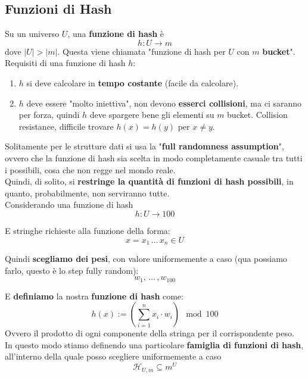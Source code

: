 
\newpage

\subsection{Funzioni di Hash}

Su un universo $U$, una \textbf{funzione di hash} è 
$$ h: U \rightarrow m $$
dove $|U| > |m|$. Questa viene chiamata "funzione di hash per $U$ con $m$ \textbf{bucket}".\\

Requisiti di una funzione di hash $h$: 
\begin{enumerate}
	\item $h$ si deve calcolare in \textbf{tempo costante} (facile da calcolare).\\
	
	\item $h$ deve essere "molto iniettiva", non devono \textbf{esserci collisioni}, ma ci saranno per forza, quindi $h$ deve spargere bene gli elementi su $m$ bucket. Collision resistance, difficile trovare $h(x) = h(y)$ per $x \neq y$.\\
\end{enumerate}

Solitamente per le strutture dati si usa la "\textbf{full randomness assumption}", ovvero che la funzione di hash sia scelta in modo completamente casuale tra tutti i possibili, cosa che non regge nel mondo reale.\\

Quindi, di solito, si \textbf{restringe la quantità di funzioni di hash possibili}, in quanto, probabilmente, non serviranno tutte.\\

Considerando una funzione di hash 
$$ h: U \rightarrow 100$$

E stringhe richieste alla funzione della forma: 
$$ x = x_1 \, \dots \, x_n \in U $$

Quindi \textbf{scegliamo dei pesi}, con valore uniformemente a caso (qua possiamo farlo, questo è lo step fully random):
$$ w_1, \, \dots \, , w_{100}$$

\newpage

E \textbf{definiamo} la nostra \textbf{funzione di hash} come:
$$ h(x) := \left(\sum_{i=1}^{n} x_i \cdot w_i \right) \mod 100 $$
Ovvero il prodotto di ogni componente della stringa per il corrispondente peso.\\

In questo modo stiamo definendo una particolare \textbf{famiglia di funzioni di hash}, all'interno della quale posso scegliere uniformemente a caso
$$ \mathcal{H}_{U,m} \subseteq m^U $$


